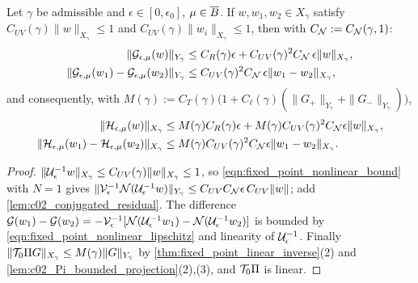 \begin{lemma}
  \label{lem:c02_forcing_bounds}
  Let $\gamma$ be admissible and $\epsilon\in[0,\epsilon_0]$, $\mu\in\overline{B}$. If $w,w_1,w_2\in X_\gamma$ satisfy
  $C_{UV}(\gamma)\|w\|_{X_\gamma}\le1$ and $C_{UV}(\gamma)\|w_i\|_{X_\gamma}\le1$, then with $C_{\mathcal{N}}:=C_{\mathcal{N}}(\gamma,1)$:
  \begin{align*}
    \|\mathcal{G}_{\epsilon,\mu}(w)\|_{Y_\gamma}&\le C_R(\gamma)\epsilon+C_{UV}(\gamma)^2C_{\mathcal{N}}\,\epsilon\|w\|_{X_\gamma},\\
    \|\mathcal{G}_{\epsilon,\mu}(w_1)-\mathcal{G}_{\epsilon,\mu}(w_2)\|_{Y_\gamma}&\le C_{UV}(\gamma)^2C_{\mathcal{N}}\,\epsilon\|w_1-w_2\|_{X_\gamma},
  \end{align*}
  and consequently, with $M(\gamma):=C_T(\gamma)\bigl(1+C_\ell(\gamma)(\|G_+\|_{Y_\gamma}+\|G_-\|_{Y_\gamma})\bigr)$,
  \begin{align}
    \|\mathcal{H}_{\epsilon,\mu}(w)\|_{X_\gamma}&\le M(\gamma)C_R(\gamma)\epsilon+M(\gamma)C_{UV}(\gamma)^2C_{\mathcal{N}}\epsilon\|w\|_{X_\gamma},\label{eqn:fixed_point_self_map_bound}\\
    \|\mathcal{H}_{\epsilon,\mu}(w_1)-\mathcal{H}_{\epsilon,\mu}(w_2)\|_{X_\gamma}&\le M(\gamma)C_{UV}(\gamma)^2C_{\mathcal{N}}\epsilon\|w_1-w_2\|_{X_\gamma}.\label{eqn:fixed_point_contraction_bound}
  \end{align}
\end{lemma}
\begin{proof}
  $\|\mathcal{U}_\epsilon^{-1}w\|_{X_\gamma}\le C_{UV}(\gamma)\|w\|_{X_\gamma}\le1$, so \eqref{eqn:fixed_point_nonlinear_bound} with $N=1$ gives
  $\|\mathcal{V}_\epsilon^{-1}\mathcal{N}(\mathcal{U}_\epsilon^{-1}w)\|_{Y_\gamma}\le C_{UV}C_{\mathcal{N}}\epsilon\,C_{UV}\|w\|$; add \cref{lem:c02_conjugated_residual}. The difference
  $\mathcal{G}(w_1)-\mathcal{G}(w_2)=-\mathcal{V}_\epsilon^{-1}[\mathcal{N}(\mathcal{U}_\epsilon^{-1}w_1)-\mathcal{N}(\mathcal{U}_\epsilon^{-1}w_2)]$ is bounded by \eqref{eqn:fixed_point_nonlinear_lipschitz} and linearity of
  $\mathcal{U}_\epsilon^{-1}$. Finally $\|\mathcal{T}_0\Pi G\|_{X_\gamma}\le M(\gamma)\|G\|_{Y_\gamma}$ by \cref{thm:fixed_point_linear_inverse}(2) and
  \cref{lem:c02_Pi_bounded_projection}(2),(3), and $\mathcal{T}_0\Pi$ is linear.
\end{proof}


